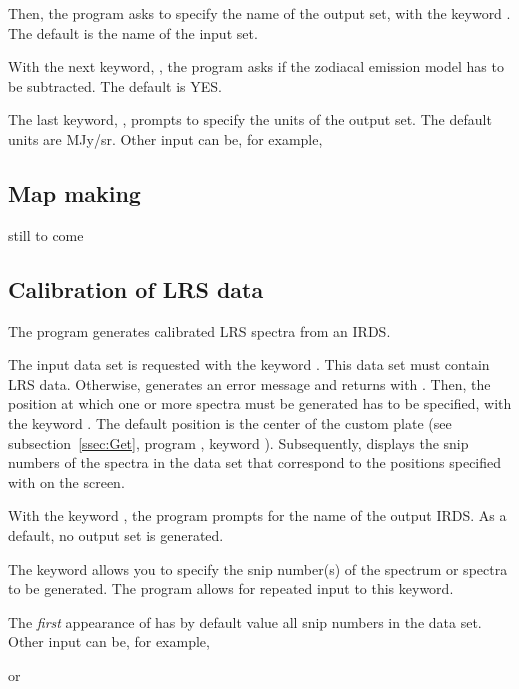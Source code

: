 Then, the program asks to specify the name of the output set, with the
keyword .  The default is the name of the input set. 

With the next keyword, , the program asks if the zodiacal
emission model has to be subtracted.  The default is YES. 

The last keyword, , prompts to specify the units of the
output set.  The default units are MJy/sr.  Other input can be, for
example,


\subsection{Map making}
\label{ssec:Map}

still to come

\subsection{Calibration of LRS data}\label{ssec:CalLRS}

The program  generates calibrated LRS spectra from an
IRDS. 

The input data set is requested with the keyword .  This
data set must contain LRS data.  Otherwise,  generates
an error message and returns with .  Then, the position
at which one or more spectra must be generated has to be specified, with
the keyword .  The default position is the center of the
custom plate (see subsection~\ref{ssec:Get}, program ,
keyword ).  Subsequently,  displays the
snip numbers of the spectra in the data set that correspond to the
positions specified with  on the screen. 

With the keyword , the program prompts for the name
of the output IRDS.  As a default, no output set is generated. 

The keyword  allows you to specify the snip number(s) of
the spectrum or spectra to be generated.  The program allows for
repeated input to this keyword. 

The {\em first} appearance of  has by default value all
snip numbers in the data set.  Other input can be, for example,


or

